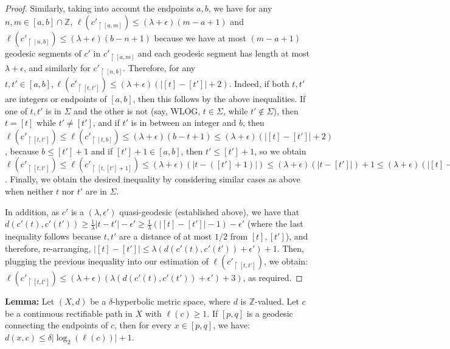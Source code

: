 \documentclass[12pt]{article}
\newcommand{\vs}{\vskip10pt}
\begin{document}
\begin{proof}
		Similarly, taking into account the endpoints $a,b$, we have for any $n,m \in [a,b] \cap \mathbb{Z}$, $\ell(c'_{\restriction [a,m]}) \leq (\lambda + \epsilon)(m-a+1)$ and $\ell(c'_{\restriction [n,b]}) \leq (\lambda + \epsilon)(b- n +1)$ because we have at most $(m - a + 1)$ geodesic segments of $c'$ in $c'_{\restriction [a,m]}$ and each geodesic segment has length at most $\lambda + \epsilon$, and similarly for $c'_{\restriction [n,b]}$. Therefore, for any $t, t' \in [a,b], \ell(c'_{\restriction [t, t']}) \leq (\lambda + \epsilon)(\vert [t] - [t'] \vert + 2)$. Indeed, if both $t,t'$ are integers or endpoints of $[a,b]$, then this follows by the above inequalities. If one of $t,t'$ is in $\Sigma$ and the other is not (say, WLOG, $t \in \Sigma$, while $t' \notin \Sigma$), then $t = [t]$ while $t' \neq [t']$, and if $t'$ is in between an integer and $b$, then $\ell(c'_{\restriction [t, t']}) \leq \ell(c'_{\restriction [t, b]}) \leq (\lambda + \epsilon)(b - t + 1) \leq  (\lambda + \epsilon)(\vert [t] - [t'] \vert + 2)$, because $b \leq [t'] + 1$ and if $[t'] + 1 \in [a,b]$, then $t' \leq [t'] + 1$, so we obtain $\ell(c'_{\restriction [t, t']}) \leq \ell(c'_{\restriction [t, [t']+1]}) \leq (\lambda + \epsilon)(\vert t - ([t'] + 1) \vert) \leq (\lambda + \epsilon)(\vert t - [t'] \vert) + 1 \leq (\lambda + \epsilon)(\vert [t] - [t'] \vert + 2)$. Finally, we obtain the desired inequality by considering similar cases as above when neither $t$ nor $t'$ are in $\Sigma$. 
		
		\vs 
		
	In addition, as $c'$ is a $(\lambda, \epsilon')$ quasi-geodesic (established above), we have that $d(c'(t), c'(t')) \geq \frac{1}{\lambda} \vert t - t' \vert - \epsilon' \geq \frac{1}{\lambda} (\vert [t] - [t'] \vert -1) - \epsilon'$ (where the last inequality follows because $t,t'$ are a distance of at most $1/2$ from $[t], [t']$), and therefore, re-arranging, $\vert [t] - [t'] \vert \leq \lambda(d(c'(t), c'(t')) + \epsilon') + 1$. Then, plugging the previous inequality into our estimation of $\ell(c'_{\restriction [t, t']})$, we obtain: $\ell(c'_{\restriction [t, t']}) \leq (\lambda + \epsilon)(\lambda(d(c'(t), c'(t')) + \epsilon') + 3)$, as required. 
		
	\end{proof}
	
	\vs 
	
	\textbf{Lemma: } Let $(X,d)$ be a $\delta$-hyperbolic metric space, where $d$ is $\mathbb{Z}$-valued. Let $c$ be a continuous rectifiable path in $X$ with $\ell(c) \geq 1$. If $[p,q]$ is a geodesic connecting the endpoints of $c$, then for every $x \in [p,q]$, we have: $d(x,c) \leq \delta \vert \log_2( \ell(c)) \vert + 1$. 
	
\end{document}
